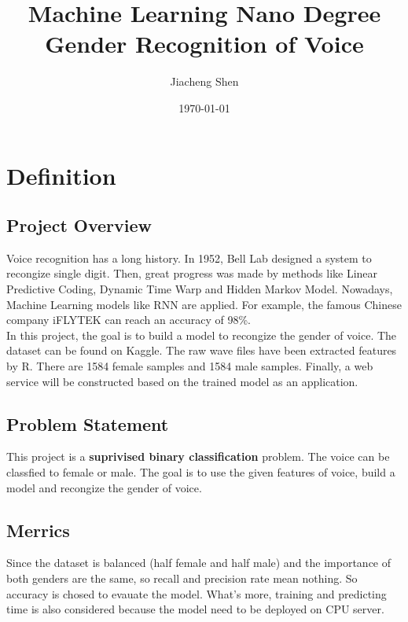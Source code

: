 \documentclass[12pt,a4paper]{article}
\title{Machine Learning Nano Degree \\
    Gender Recognition of Voice }
\author{Jiacheng Shen}
\date{\today}
\theoremstyle{definition}
\begin{document}
\noindent

\maketitle

\tableofcontents

\newpage

\section{Definition}

\subsection{Project Overview}
Voice recognition has a long history. In 1952, Bell Lab designed a system to recongize single digit. Then, great progress was made by methods like Linear Predictive Coding, Dynamic Time Warp and Hidden Markov Model. Nowadays, Machine Learning models like RNN are applied.\cite{voice_recognize_history} For example, the famous Chinese company iFLYTEK can reach an accuracy of 98\%.\cite{iFLYTEK} \\

\noindent
In this project, the goal is to build a model to recongize the gender of voice. The dataset can be found on Kaggle\cite{kaggle}. The raw wave files have been extracted features by R. There are 1584 female samples and 1584 male samples. Finally, a web service will be constructed based on the trained model as an application.

\subsection{Problem Statement}

This project is a \textbf{suprivised binary classification} problem. The voice can be classfied to female or male. The goal is to use the given features of voice, build a model and recongize the gender of voice. 

\subsection{Merrics}

Since the dataset is balanced (half female and half male) and the importance of both genders are the same, so recall and precision rate mean nothing. So accuracy is chosed to evauate the model. What's more, training and predicting time is also considered because the model need to be deployed on CPU server.
\end{document}
